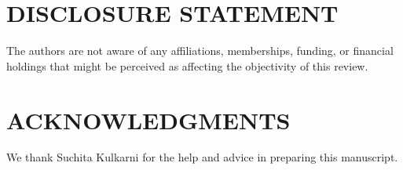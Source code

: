 \documentclass{ar-1col}
\begin{document}
\section*{DISCLOSURE STATEMENT}
The authors are not aware of any affiliations, memberships, funding, or financial holdings that
might be perceived as affecting the objectivity of this review. 

\section*{ACKNOWLEDGMENTS}
We thank Suchita Kulkarni for the help and advice in preparing this manuscript. 
%



\end{document}
